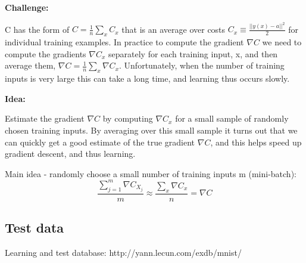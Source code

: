 \documentclass[10pt,a4paper]{article}
\begin{document}
\textbf{Challenge:}

C has the form of $C = \frac{1}{n}\sum_x C_x$ that is an average over costs $C_x \equiv \frac{||y(x)-a ||^2}{2}$ for individual training examples. In practice to compute the gradient $\nabla C$ we need to compute the gradients $\nabla C_x$ separately for each training input, x, and then average them, $\nabla C = \frac{1}{n}\sum_x\nabla C_x$. Unfortunately, when the number of training inputs is very large this can take a long time, and learning thus occurs slowly.

\textbf{Idea:}

Estimate the gradient $\nabla C$ by computing $\nabla C_x$ for a small sample of randomly chosen training inputs. By averaging over this small sample it turns out that we can quickly get a good estimate of the true gradient $\nabla C$, and this helps speed up gradient descent, and thus learning.

Main idea - randomly choose a small number of training inputs m (mini-batch):
$$ \frac{\sum_{j=1}^m \nabla C_{X_j}}{m} \approx \frac{\sum_x \nabla C_x}{n} = \nabla C$$

\subsection{Test data}

Learning and test database: http://yann.lecun.com/exdb/mnist/
\end{document}
